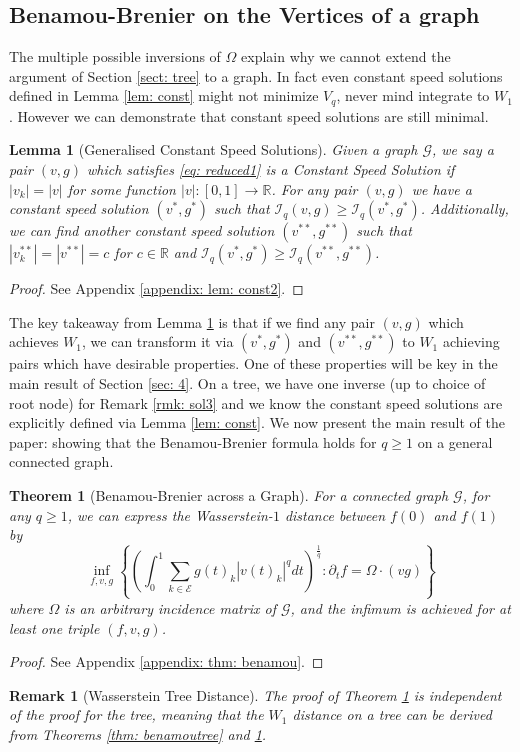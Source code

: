 \documentclass[conference]{IEEEtran}
\newcommand{\GG}{\mathcal{G}}
\newcommand{\EE}{\mathcal{E}}
\theoremstyle{ieeestyle}
\newtheorem{thm}{Theorem}
\newtheorem{lem}{Lemma}
\newtheorem{rmk}{Remark}
\begin{document}
\subsection{Benamou-Brenier on the Vertices of a graph}
The multiple possible inversions of $\Omega$ explain why we cannot extend the argument of Section \ref{sect: tree} to a graph. In fact even constant speed solutions defined in Lemma \ref{lem: const} might not minimize $V_q$, never mind integrate to $W_1$. However we can demonstrate that constant speed solutions are still minimal.
\begin{lem}[Generalised Constant Speed Solutions]\label{lem: const2}
    Given a graph $\GG$, we say a pair $(v,g)$ which satisfies \eqref{eq: reduced1} is a \textit{Constant Speed Solution} if $|v_k| = |v|$ for some function $|v|: [0,1] \rightarrow \mathbb{R}$. For any pair $(v,g)$ we have a constant speed solution $(v^*,g^*)$ such that $\mathcal{I}_q(v,g) \geq \mathcal{I}_q(v^*,g^*)$. Additionally, we can find another constant speed solution $(v^{**},g^{**})$ such that $|v^{**}_k| = |v^{**}| = c$ for $c \in \mathbb{R}$ and $\mathcal{I}_q(v^{*},g^{*}) \geq \mathcal{I}_q(v^{**},g^{**})$.
\end{lem}
\begin{proof}
     See Appendix \ref{appendix: lem: const2}.
\end{proof}
The key takeaway from Lemma \ref{lem: const2} is that if we find any pair $(v,g)$ which achieves $W_1$, we can transform it via $(v^*,g^*)$ and $(v^{**},g^{**})$ to $W_1$ achieving pairs which have desirable properties. One of these properties will be key in the main result of Section \ref{sec: 4}. On a tree, we have one inverse (up to choice of root node) for Remark \ref{rmk: sol3} and we know the constant speed solutions are explicitly defined via Lemma \ref{lem: const}. 
\newline \newline 
We now present the main result of the paper: showing that the Benamou-Brenier formula holds for $q \geq 1$ on a general connected graph.
\begin{thm}[Benamou-Brenier across a Graph]\label{thm: benamou}
    For a connected graph $\GG$, for any $q \geq 1$, we can express the Wasserstein-$1$ distance between $f(0)$ and $f(1)$ by
    \begin{equation}
        \inf_{f,v,g} \left\{\left( \int_0^1 \sum_{k \in \EE} g(t)_k |v(t)_k|^q dt\right)^{\frac{1}{q}} : \partial_t f = \Omega \cdot (vg) \right\}
    \end{equation}
    where $\Omega$ is an arbitrary incidence matrix of $\GG$, and the infimum is achieved for at least one triple $(f,v,g)$.
\end{thm}
\begin{proof}
    See Appendix \ref{appendix: thm: benamou}.
\end{proof}
\begin{rmk}[Wasserstein Tree Distance]
    The proof of Theorem \ref{thm: benamou} is independent of the proof for the tree, meaning that the $W_1$ distance on a tree can be derived from Theorems \ref{thm: benamoutree} and \ref{thm: benamou}.
\end{rmk}
\end{document}
